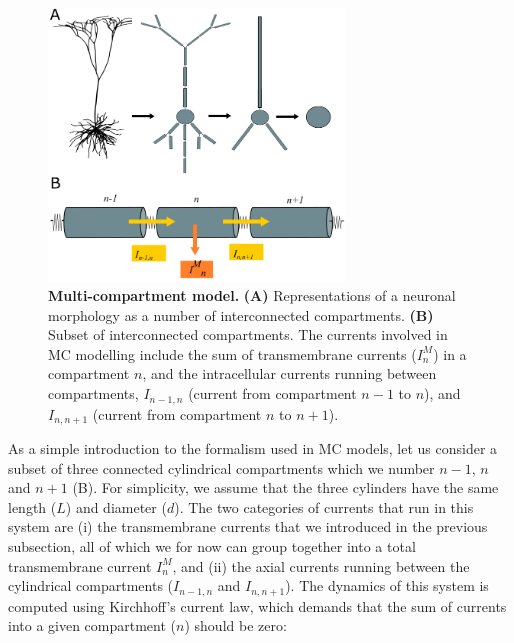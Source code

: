 \begin{figure}[!ht]
\begin{center}
\includegraphics[width=0.7\textwidth]{Figures/Neuron/multikompis.png}
\end{center}
\caption{\textbf{Multi-compartment model.} {\bf (A)} Representations of a neuronal morphology as a number of interconnected compartments. {\bf (B)} Subset of interconnected compartments. The currents involved in MC modelling include the sum of transmembrane currents ($I^M_n$) in a compartment $n$, and the intracellular currents running between 
compartments, $I_{n-1,n}$ (current from compartment $n-1$ to $n$), and $I_{n,n+1}$ (current from compartment $n$ to $n+1$).}
\label{fig:Neuron:multikompisen}
\end{figure}

As a simple introduction to the formalism used in MC models, let us consider a subset of three connected cylindrical compartments which we number $n-1$, $n$ and $n+1$ (B). For simplicity, we assume that the three cylinders have the same length ($L$) and diameter ($d$). The two categories of currents that run in this system are (i) the transmembrane currents that we introduced in the previous subsection, all of which we for now can group together into a total transmembrane current $I^M_n$, and (ii) the axial currents running between the cylindrical compartments ($I_{n-1,n}$ and $I_{n,n+1}$). The dynamics of this system is computed using Kirchhoff's current law, which demands that the sum of currents into a given compartment ($n$) should be zero:

